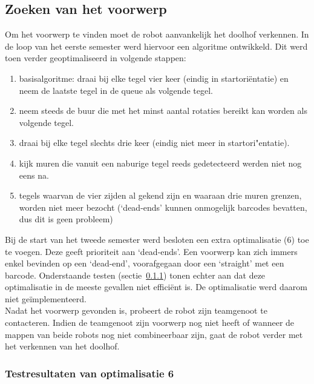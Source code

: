 \documentclass[tt3]{penoverslag}
\begin{document}
\subsection{Zoeken van het voorwerp} %
\label{ssec:AlgoZoek}
Om het voorwerp te vinden moet de robot aanvankelijk het doolhof verkennen. In de loop van het eerste semester werd hiervoor een algoritme ontwikkeld. Dit werd toen verder geoptimaliseerd in volgende stappen: 

\begin{enumerate}
\item basisalgoritme: draai bij elke tegel vier keer (eindig in startori\"entatie) en neem de laatste tegel in de queue als volgende tegel.
\item neem steeds de buur die met het minst aantal rotaties bereikt kan worden als volgende tegel.
\item draai bij elke tegel slechts drie keer (eindig niet meer in startori"entatie).
\item kijk muren die vanuit een naburige tegel reeds gedetecteerd werden  niet nog eens na.
\item tegels waarvan de vier zijden al gekend zijn en waaraan drie muren grenzen, worden niet meer bezocht (`dead-ends' kunnen onmogelijk barcodes bevatten, dus dit is geen probleem)
\end{enumerate}

Bij de start van het tweede semester werd besloten een extra optimalisatie (6) toe te voegen. Deze geeft prioriteit aan `dead-ends'. Een voorwerp kan zich immers enkel bevinden op een `dead-end', voorafgegaan door een `straight' met een barcode. Onderstaande testen (sectie~\ref{ssec:AlgoZoekTest}) tonen echter aan dat deze optimalisatie in de meeste gevallen niet effici\"ent is. De optimalisatie werd daarom niet ge\"implementeerd.\\

Nadat het voorwerp gevonden is, probeert de robot zijn teamgenoot te contacteren. Indien de teamgenoot zijn voorwerp nog niet heeft of wanneer de mappen van beide robots nog niet combineerbaar zijn, gaat de robot verder met het verkennen van het doolhof. \\

\subsubsection{Testresultaten van optimalisatie 6}
\label{ssec:AlgoZoekTest}
\end{document}
